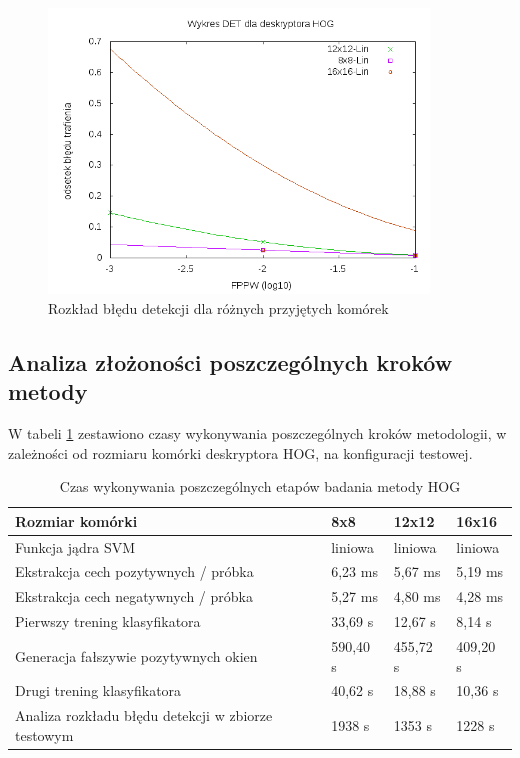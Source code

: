 \begin{figure}[htb]
\centering
\includegraphics[width=0.9\textwidth]{hog_det.png}
\caption{Rozkład błędu detekcji dla różnych przyjętych komórek}
\label{fig:hog_det}
\end{figure}

\subsection{Analiza złożoności poszczególnych kroków metody}

W tabeli \ref{tab:hog_times} zestawiono czasy wykonywania poszczególnych kroków metodologii, w zależności od rozmiaru komórki deskryptora HOG, na konfiguracji testowej.

\begin{center}
    \begin{longtable}{ | p{5cm} | p{3cm} | p{3cm} | p{3cm} |}
    \caption{Czas wykonywania poszczególnych etapów badania metody HOG}
    \label{tab:hog_times}\\
    \hline
	Rozmiar komórki & 8x8 & 12x12 & 16x16 \\ \hline
	Funkcja jądra SVM & liniowa & liniowa & liniowa  \\ \hline
    Ekstrakcja cech pozytywnych / próbka & 6,23 ms & 5,67 ms & 5,19 ms \\ \hline
    Ekstrakcja cech negatywnych / próbka & 5,27 ms & 4,80 ms & 4,28 ms \\ \hline
    Pierwszy trening klasyfikatora & 33,69 s & 12,67 s & 8,14 s \\ \hline
    Generacja fałszywie pozytywnych okien & 590,40 s & 455,72 s & 409,20 s \\ \hline
    Drugi trening klasyfikatora & 40,62 s & 18,88 s & 10,36 s \\ \hline
    Analiza rozkładu błędu detekcji w zbiorze testowym & 1938 s & 1353 s & 1228 s \\ \hline
    \end{longtable}
\end{center}

